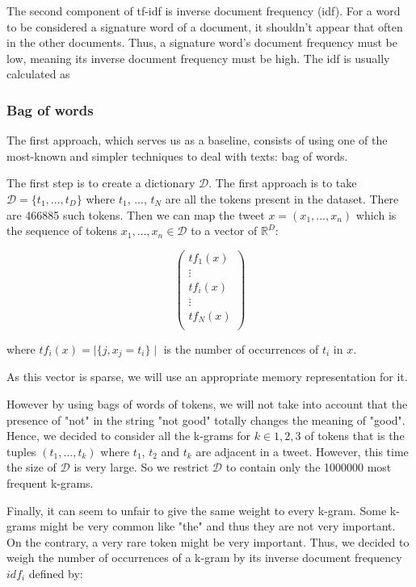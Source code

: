 \documentclass[10pt,conference,compsocconf,retainorgcmds]{IEEEtran}
\begin{document}
The second component of tf-idf is inverse document frequency (idf). For a word to be considered a signature word of a document, it shouldn’t appear that often in the other documents. Thus, a signature word’s document frequency must be low, meaning its inverse document frequency must be high. The idf is usually calculated as



\subsubsection{Bag of words}

The first approach, which serves us as a baseline, consists of using one of the most-known and simpler techniques to deal with texts: bag of words.


The first step is to create a dictionary $\mathcal{D}$. The first approach is to take $\mathcal{D} = \{ t_1, ..., t_D \}$ where $t_1$, ..., $t_N$ are all the tokens present in the dataset. There are 466885 such tokens. Then we can map the tweet $x = (x_1, ..., x_n)$ which is the sequence of tokens $x_1, ..., x_n \in \mathcal{D}$ to a vector of $\mathbb{R}^D$:

$$
\left(
\begin{array}{c}
tf_1(x) \\
\vdots \\
tf_i(x) \\
\vdots \\
tf_N(x) \\
\end{array}
\right)
$$

where $tf_i(x) = \mid \{j, x_j = t_i \} \mid$ is the number of occurrences of $t_i$ in $x$.

As this vector is sparse, we will use an appropriate memory representation for it.

However by using bags of words of tokens, we will not take into account that the presence of "not" in the string "not good" totally changes the meaning of "good". Hence, we decided to consider all the k-grams for $k \in {1, 2, 3}$ of tokens that is the tuples $(t_1, ..., t_k)$ where $t_1$, $t_2$ and $t_k$ are adjacent in a tweet. However, this time the size of $\mathcal{D}$ is very large. So we restrict $\mathcal{D}$ to contain only the 1000000 most frequent k-grams.

Finally, it can seem to unfair to give the same weight to every k-gram. Some k-grams might be very common like "the" and thus they are not very important. On the contrary, a very rare token might be very important. Thus, we decided to weigh the number of occurrences of a k-gram by its inverse document frequency $idf_i$ defined by:
\end{document}
